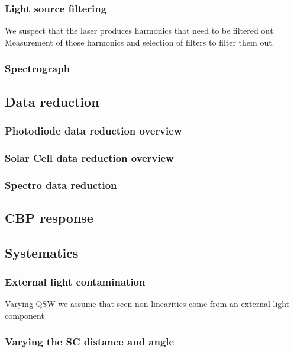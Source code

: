 \documentclass[onecolumn]{aa}
\begin{document}
\subsubsection{Light source filtering}

We suspect that the laser produces harmonics that need to be filtered
out. Measurement of those harmonics and selection of filters to filter them
out. 


\subsubsection{Spectrograph}


\subsection{Data reduction}



\subsubsection{Photodiode data reduction overview}

\subsubsection{Solar Cell data reduction overview}

\subsubsection{Spectro data reduction}


\subsection{CBP response}

\subsection{Systematics}


\subsubsection{External light contamination}

Varying QSW we assume that seen non-linearities come from an external light component

\subsubsection{Varying the SC distance and angle}
\end{document}
